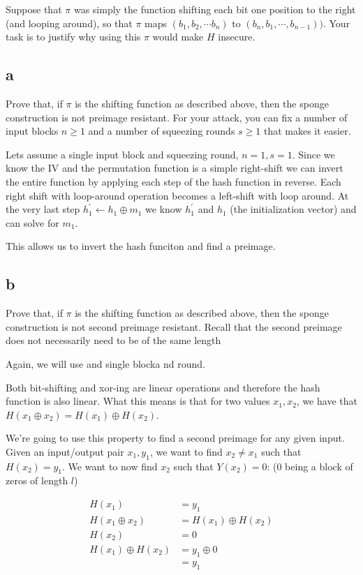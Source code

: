 \documentclass[11pt]{article}
\begin{document}
Suppose that $\pi$ was simply the function shifting each bit one position to the right (and looping around), so that $\pi$ maps $(b_1, b_2, \cdots b_n)$ to $(b_n, b_1, \cdots, b_{n-1}))$. Your task is to justify why using this $\pi$ would make $H$ insecure.

\subsection{a}

Prove that, if $\pi$ is the shifting function as described above, then the sponge construction is not preimage resistant. For your attack, you can fix a number of input blocks $n \geq 1$ and a number of squeezing rounds $s \geq 1$ that makes it easier.

Lets assume a single input block and squeezing round, $n = 1, s = 1$. Since we know the IV and the permutation function is a simple right-shift we can invert the entire function by applying each step of the hash function in reverse. Each right shift with loop-around operation becomes a left-shift with loop around. At the very last step $h_1^\prime \leftarrow h_1 \oplus m_1$ we know $h_1^\prime$ and $h_1$ (the initialization vector) and can solve for $m_1$.

This allows us to invert the hash funciton and find a preimage.


\subsection{b}

Prove that, if $\pi$ is the shifting function as described above, then the sponge construction is not second preimage resistant. Recall that the second preimage does not necessarily need to be of the same length

Again, we will use and single blocka nd round.

Both bit-shifting and xor-ing are linear operations and therefore the hash function is also linear. What this means is that for two values $x_1, x_2$, we have that $H(x_1 \oplus x_2) = H(x_1) \oplus H(x_2)$.

We're going to use this property to find a second preimage for any given input. Given an input/output pair $x_1, y_1$, we want to find $x_2 \neq x_1$ such that $H(x_2) = y_1$. We want to now find $x_2$ such that $Y(x_2) = 0$: ($0$ being a block of zeros of length $l$)

\begin{align*}
    H(x_1) &= y_1 \\
    H(x_1 \oplus x_2) &= H(x_1) \oplus H(x_2) \\
    H(x_2) &= 0 \\
    H(x_1) \oplus H(x_2) &= y_1 \oplus 0 \\
    &= y_1
\end{align*}
\end{document}
